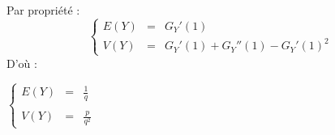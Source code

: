 Par propriété :
\[
  \left\{
  \begin{array}{rcl}
    E(Y) & = & G_Y'(1)                        \\
    V(Y) & = & G_Y'(1) + G_Y''(1) - G_Y'(1)^2
  \end{array}
  \right.
\]
D'où :
\begin{result}
  $
    \left\{
      \begin{array}{rcl}
        E(Y) & = & \frac{1}{q}   \\\\
        V(Y) & = & \frac{p}{q^2}
      \end{array}
    \right.
  $
\end{result}
